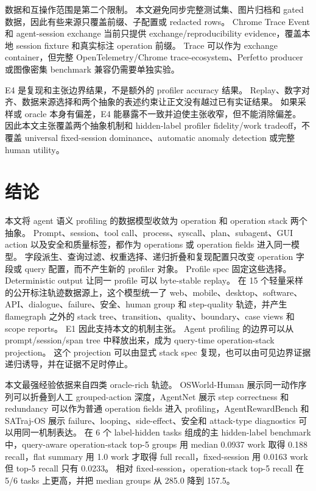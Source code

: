 \documentclass[10pt,twocolumn]{ctexart}
\begin{document}
数据和互操作范围是第二个限制。
本文避免同步完整测试集、图片归档和 gated 数据，因此有些来源只覆盖前缀、子配置或 redacted rows。
Chrome Trace Event 和 agent-session exchange 当前只提供 exchange/reproducibility evidence，覆盖本地 session fixture 和真实标注 operation 前缀。
Trace 可以作为 exchange container，但完整 OpenTelemetry/Chrome trace-ecosystem、Perfetto producer 或图像密集 benchmark 兼容仍需要单独实验。

E4 是复现和主张边界结果，不是额外的 profiler accuracy 结果。
Replay、数字对齐、数据来源选择和两个抽象的表述约束让正文没有越过已有实证结果。
如果采样或 oracle 本身有偏差，E4 能暴露不一致并迫使主张收窄，但不能消除偏差。
因此本文主张覆盖两个抽象机制和 hidden-label profiler fidelity/work tradeoff，不覆盖 universal fixed-session dominance、automatic anomaly detection 或完整 human utility。

\section{结论}

本文将 agent 语义 profiling 的数据模型收敛为 operation 和 operation stack 两个抽象。
Prompt、session、tool call、process、syscall、plan、subagent、GUI action 以及安全和质量标签，都作为 operations 或 operation fields 进入同一模型。
字段派生、查询过滤、权重选择、递归折叠和复现配置只改变 operation 字段或 query 配置，而不产生新的 profiler 对象。
Profile spec 固定这些选择。
Deterministic output 让同一 profile 可以 byte-stable replay。
在 15 个轻量采样的公开标注轨迹数据源上，这个模型统一了 web、mobile、desktop、software、API、dialogue、failure、安全、human group 和 step-quality 轨迹，并产生 flamegraph 之外的 stack tree、transition、quality、boundary、case views 和 scope reports。
E1 因此支持本文的机制主张。
Agent profiling 的边界可以从 prompt/session/span tree 中释放出来，成为 query-time operation-stack projection。
这个 projection 可以由显式 stack spec 复现，也可以由可见边界证据递归诱导，并在证据不足时停止。

本文最强经验依据来自四类 oracle-rich 轨迹。
OSWorld-Human 展示同一动作序列可以折叠到人工 grouped-action 深度，AgentNet 展示 step correctness 和 redundancy 可以作为普通 operation fields 进入 profiling，AgentRewardBench 和 SATraj-OS 展示 failure、looping、side-effect、安全和 attack-type diagnostics 可以用同一机制表达。
在 6 个 label-hidden tasks 组成的主 hidden-label benchmark 中，query-aware operation-stack top-5 groups 用 median 0.0937 work 取得 0.188 recall，flat summary 用 1.0 work 才取得 full recall，fixed-session 用 0.0163 work 但 top-5 recall 只有 0.0233。
相对 fixed-session，operation-stack top-5 recall 在 5/6 tasks 上更高，并把 median groups 从 285.0 降到 157.5。
\end{document}
